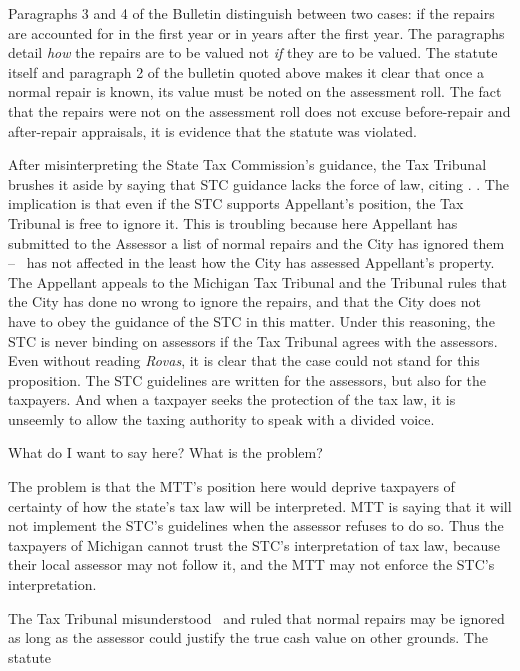 \documentclass[12pt,\documentclassflag]{michiganCourtOfAppealsBrief}
\newcommand*\ruleline[1]{%
  \par\noindent%
  \raisebox{.8ex}{\makebox[\linewidth]{\hrulefill\hspace{1ex}%
      \raisebox{-.8ex}{#1}%
      \hspace{1ex}\hrulefill}}}%
\newenvironment{draft}{%
  \color{blue}%
  \ruleline{Begin Draft}
}{%
  \ruleline{End Draft}
  \color{black}%
}
\begin{document}
Paragraphs 3 and 4 of the Bulletin distinguish between two cases: if the repairs are accounted for in the first year or in years after the first year. The paragraphs detail \textit{how} the repairs are to be valued not \textit{if} they are to be valued. The statute itself and paragraph 2 of the bulletin quoted above makes it clear that once a normal repair is known, its value must be noted on the assessment roll. The fact that the repairs were not on the assessment roll does not excuse before-repair and after-repair appraisals, it is evidence that the statute was violated.

\begin{draft}
After misinterpreting the State Tax Commission's guidance, the Tax Tribunal brushes it aside by saying that STC guidance lacks the force of law, citing \cite{Rovas}. \foj[2]. The implication is that even if the STC supports Appellant's position, the Tax Tribunal is free to ignore it. This is troubling because here Appellant has submitted to the Assessor a list of normal repairs and the City has ignored them -- \mathieuGast\ has not affected in the least how the City has assessed Appellant's property. The Appellant appeals to the Michigan Tax Tribunal and the Tribunal rules that the City has done no wrong to ignore the repairs, and that the City does not have to obey the guidance of the STC in this matter. Under this reasoning, the STC is never binding on assessors if the Tax Tribunal agrees with the assessors. Even without reading \textit{Rovas}, it is clear that the case could not stand for this proposition. The STC guidelines are written for the assessors, but also for the taxpayers. And when a taxpayer seeks the protection of the tax law, it is unseemly to allow the taxing authority to speak with a divided voice.

What do I want to say here? What is the problem?

The problem is that the MTT's position here would deprive taxpayers of certainty of how the state's tax law will be interpreted. MTT is saying that it will not implement the STC's guidelines when the assessor refuses to do so. Thus the taxpayers of Michigan cannot trust the STC's interpretation of tax law, because their local assessor may not follow it, and the MTT may not enforce the STC's interpretation.

The Tax Tribunal misunderstood \mathieuGast\ and ruled that normal repairs may be ignored as long as the assessor could justify the true cash value on other grounds. The statute

\end{draft}
\end{document}
